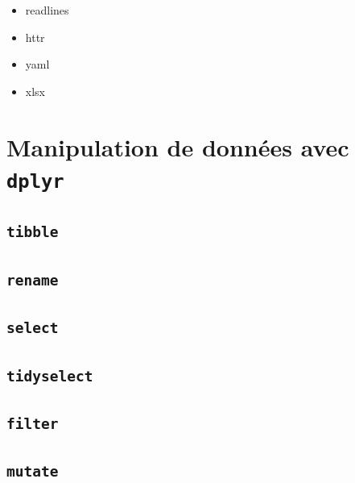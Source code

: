 \documentclass[
  letterpaper,
  DIV=11,
  numbers=noendperiod]{scrreprt}
\providecommand{\tightlist}{%
  \setlength{\itemsep}{0pt}\setlength{\parskip}{0pt}}\usepackage{longtable,booktabs,array}
\begin{document}
\begin{itemize}
\tightlist
\item
  readlines
\item
  httr
\item
  yaml
\item
  xlsx
\end{itemize}


\hypertarget{manipulation-de-donnuxe9es-avec-dplyr}{%
\chapter{\texorpdfstring{Manipulation de données avec
\texttt{dplyr}}{Manipulation de données avec dplyr}}\label{manipulation-de-donnuxe9es-avec-dplyr}}

\hypertarget{tibble}{%
\section{\texorpdfstring{\texttt{tibble}}{tibble}}\label{tibble}}

\hypertarget{rename}{%
\section{\texorpdfstring{\texttt{rename}}{rename}}\label{rename}}

\hypertarget{select}{%
\section{\texorpdfstring{\texttt{select}}{select}}\label{select}}

\hypertarget{tidyselect}{%
\section{\texorpdfstring{\texttt{tidyselect}}{tidyselect}}\label{tidyselect}}

\hypertarget{filter}{%
\section{\texorpdfstring{\texttt{filter}}{filter}}\label{filter}}

\hypertarget{mutate}{%
\section{\texorpdfstring{\texttt{mutate}}{mutate}}\label{mutate}}
\end{document}
